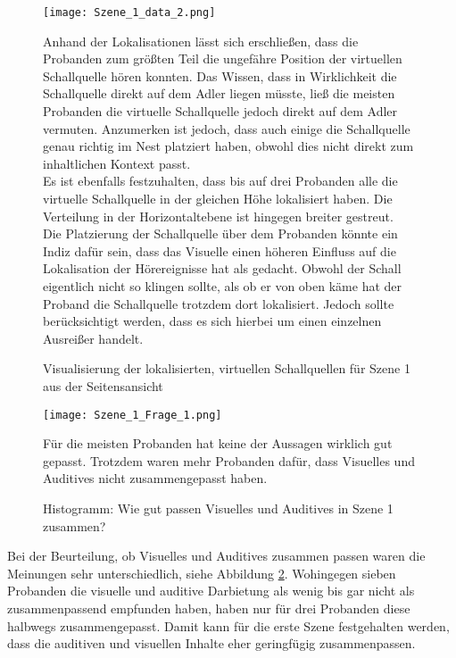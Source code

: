 \begin{figure}[H]
\begin{minipage}[t]{7cm}
\vspace{0pt}
\centering
\texttt{[image: Szene\_1\_data\_2.png]}
\caption{Visualisierung der lokalisierten, virtuellen Schallquellen für Szene 1 aus der Seitensansicht}
\label{fig:Szene_1_data_2}
\end{minipage}
\hfill
\begin{minipage}[t]{9.5cm}

Anhand der Lokalisationen lässt sich erschließen, dass die Probanden zum größten Teil die ungefähre Position der virtuellen Schallquelle hören konnten. Das Wissen, dass in Wirklichkeit die Schallquelle direkt auf dem Adler liegen müsste, ließ die meisten Probanden die virtuelle Schallquelle jedoch direkt auf dem Adler vermuten. Anzumerken ist jedoch, dass auch einige die Schallquelle genau richtig im Nest platziert haben, obwohl dies nicht direkt zum inhaltlichen Kontext passt. \\

Es ist ebenfalls festzuhalten, dass bis auf drei Probanden alle die virtuelle Schallquelle in der gleichen Höhe lokalisiert haben. Die Verteilung in der Horizontaltebene ist hingegen breiter gestreut. \\

Die Platzierung der Schallquelle über dem Probanden könnte ein Indiz dafür sein, dass das Visuelle einen höheren Einfluss auf die Lokalisation der Hörereignisse hat als gedacht. Obwohl der Schall eigentlich nicht so klingen sollte, als ob er von oben käme hat der Proband die Schallquelle trotzdem dort lokalisiert. Jedoch sollte berücksichtigt werden, dass es sich hierbei um einen einzelnen Ausreißer handelt.
\end{minipage}
\end{figure}


   \begin{figure}[H]
\centering
\texttt{[image: Szene\_1\_Frage\_1.png]}
\caption{Histogramm: Wie gut passen Visuelles und Auditives in Szene 1 zusammen?}
Für die meisten Probanden hat keine der Aussagen wirklich gut gepasst. Trotzdem waren mehr Probanden dafür, dass Visuelles und Auditives nicht zusammengepasst haben. 
\label{fig:Szene_1_Frage1}
\end{figure} 

\vspace*{30pt}

Bei der Beurteilung, ob Visuelles und Auditives zusammen passen waren die Meinungen sehr unterschiedlich, siehe Abbildung \ref{fig:Szene_1_Frage1}. Wohingegen sieben Probanden die visuelle und auditive  Darbietung als wenig bis gar nicht als zusammenpassend empfunden haben, haben nur für drei Probanden diese halbwegs zusammengepasst. Damit kann für die erste Szene festgehalten werden, dass die auditiven und visuellen Inhalte eher geringfügig zusammenpassen. \\

